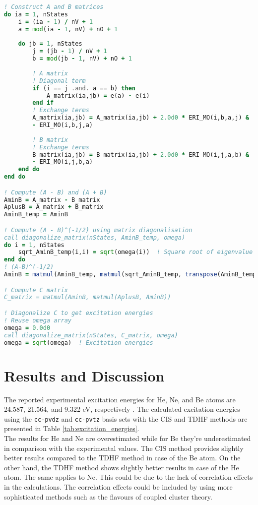 \documentclass[12pt]{article}
\begin{document}
\begin{lstlisting}[language=Fortran, firstnumber=35, label={lst:TDHF}, caption=Subroutine to calculate the TDHF excitation energies. Only part of the full code is mentioned.]
! Construct A and B matrices
do ia = 1, nStates
    i = (ia - 1) / nV + 1
    a = mod(ia - 1, nV) + nO + 1
    
    do jb = 1, nStates
        j = (jb - 1) / nV + 1
        b = mod(jb - 1, nV) + nO + 1
        
        ! A matrix
        ! Diagonal term
        if (i == j .and. a == b) then
            A_matrix(ia,jb) = e(a) - e(i)
        end if
        ! Exchange terms
        A_matrix(ia,jb) = A_matrix(ia,jb) + 2.0d0 * ERI_MO(i,b,a,j) &
        - ERI_MO(i,b,j,a)
        
        ! B matrix
        ! Exchange terms
        B_matrix(ia,jb) = B_matrix(ia,jb) + 2.0d0 * ERI_MO(i,j,a,b) &
        - ERI_MO(i,j,b,a)
    end do
end do

! Compute (A - B) and (A + B)
AminB = A_matrix - B_matrix
AplusB = A_matrix + B_matrix
AminB_temp = AminB

! Compute (A - B)^(-1/2) using matrix diagonalisation
call diagonalize_matrix(nStates, AminB_temp, omega)
do i = 1, nStates
    sqrt_AminB_temp(i,i) = sqrt(omega(i))  ! Square root of eigenvalue
end do
! (A-B)^(-1/2)
AminB = matmul(AminB_temp, matmul(sqrt_AminB_temp, transpose(AminB_temp)))

! Compute C matrix
C_matrix = matmul(AminB, matmul(AplusB, AminB))

! Diagonalize C to get excitation energies
! Reuse omega array
omega = 0.0d0
call diagonalize_matrix(nStates, C_matrix, omega)
omega = sqrt(omega)  ! Excitation energies
\end{lstlisting}

\section*{Results and Discussion}
The reported experimental excitation energies for He, Ne, and Be atoms are 24.587, 21.564, and 9.322 eV, respectively \citep{NIST_ASD}. The calculated excitation energies using the \texttt{cc-pvdz} and \texttt{cc-pvtz} basis sets with the CIS and TDHF methods are presented in Table \ref{tab:excitation_energies}. \\

The results for He and Ne are overestimated while for Be they're underestimated in comparison with the experimental values. The CIS method provides slightly better results compared to the TDHF method in case of the Be atom. On the other hand, the TDHF method shows slightly better results in case of the He atom. The same applies to Ne. This could be due to the lack of correlation effects in the calculations. The correlation effects could be included by using more sophisticated methods such as the flavours of coupled cluster theory. \\
\end{document}
